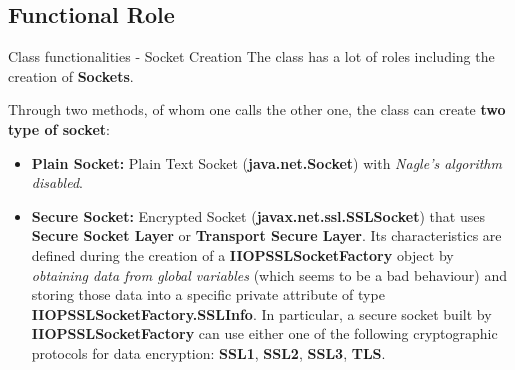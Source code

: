 \documentclass{../common/latex_classes/pdf_presentation}
\begin{document}
		\subsection{Functional Role}
		
		\begin{frame}{Class functionalities - Socket Creation}
			The class has a lot of roles including the creation of \textbf{Sockets}.\par Through two methods, of whom one calls the other one, the class can create \textbf{two type of socket}:
			\begin{itemize}
				\item \textbf{Plain Socket:}
				Plain Text Socket (\textbf{java.net.Socket}) with \textit{Nagle's algorithm disabled}.
				\item \textbf{Secure Socket:}
				Encrypted Socket (\textbf{javax.net.ssl.SSLSocket}) that uses \textbf{Secure Socket Layer} or \textbf{Transport Secure Layer}.
				Its characteristics are defined during the creation of a \textbf{IIOPSSLSocketFactory} object by \textit{obtaining data from global variables} (which seems to be a bad behaviour) and storing those data into a specific private attribute of type \textbf{IIOPSSLSocketFactory.SSLInfo}.
				In particular, a secure socket built by \textbf{IIOPSSLSocketFactory} can use either one of the following cryptographic protocols for data encryption: \textbf{SSL1}, \textbf{SSL2}, \textbf{SSL3}, \textbf{TLS}.
			\end{itemize}
		\end{frame}
		
\end{document}
